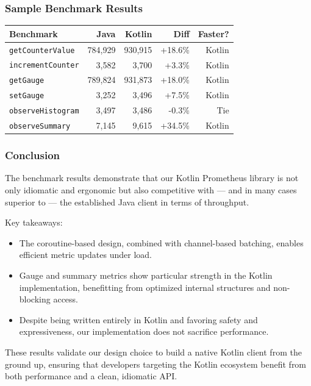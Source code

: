 \subsubsection*{Sample Benchmark Results}

\begin{center}
\begin{tabular}{lrrrr}
\toprule
\textbf{Benchmark} & \textbf{Java} & \textbf{Kotlin} & \textbf{Diff} & \textbf{Faster?} \\
\midrule
\texttt{getCounterValue}        & 784,929 & 930,915 & +18.6\% & Kotlin \\
\texttt{incrementCounter}       & 3,582   & 3,700   & +3.3\%  & Kotlin \\
\texttt{getGauge}               & 789,824 & 931,873 & +18.0\% & Kotlin \\
\texttt{setGauge}               & 3,252   & 3,496   & +7.5\%  & Kotlin \\
\texttt{observeHistogram}       & 3,497   & 3,486   & -0.3\%  & Tie \\
\texttt{observeSummary}         & 7,145   & 9,615   & +34.5\% & Kotlin \\
\bottomrule
\end{tabular}
\end{center}

\subsubsection*{Conclusion}

The benchmark results demonstrate that our Kotlin Prometheus library is not only idiomatic and ergonomic but also competitive with — and in many cases superior to — the established Java client in terms of throughput.

Key takeaways:
\begin{itemize}
    \item The coroutine-based design, combined with channel-based batching, enables efficient metric updates under load.
    \item Gauge and summary metrics show particular strength in the Kotlin implementation, benefitting from optimized internal structures and non-blocking access.
    \item Despite being written entirely in Kotlin and favoring safety and expressiveness, our implementation does not sacrifice performance.
\end{itemize}

These results validate our design choice to build a native Kotlin client from the ground up, ensuring that developers targeting the Kotlin ecosystem benefit from both performance and a clean, idiomatic API.




